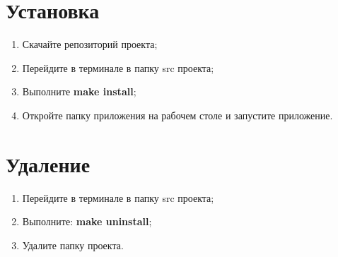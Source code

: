 \documentclass[12pt, a4paper]{article}
\begin{document}
\section{Установка}

\begin{enumerate}
    \item Скачайте репозиторий проекта;
    \item Перейдите в терминале в папку src проекта;
    \item Выполните \textbf{make install};
    \item Откройте папку приложения на рабочем столе и запустите приложение.
\end{enumerate}

\section{Удаление}

\begin{enumerate}
    \item Перейдите в терминале в папку src проекта;
    \item Выполните: \textbf{make uninstall};
    \item Удалите папку проекта.
\end{enumerate}
\end{document}
